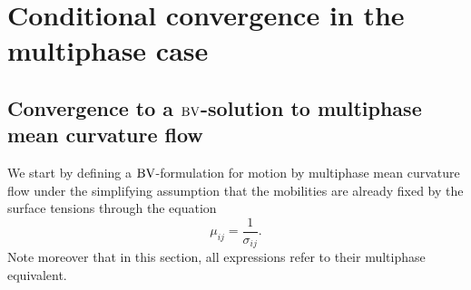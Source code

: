 \section{Conditional convergence in the multiphase case}

\subsection{Convergence to a \texorpdfstring{$ \operatorname{BV} $}{BV}-solution to 
multiphase mean curvature flow}

We start by defining a $ \operatorname{BV} $-formulation for motion by multiphase mean 
curvature flow under the simplifying assumption that the mobilities are already 
fixed by the surface tensions through the equation
\begin{equation}
	\label{mobilites_inverse_of_surface_tensions}
	\mu_{ i j } =\frac{ 1 }{ \sigma_{ i j } }. 
\end{equation}
Note moreover that in this section, all expressions refer to their multiphase 
equivalent.

